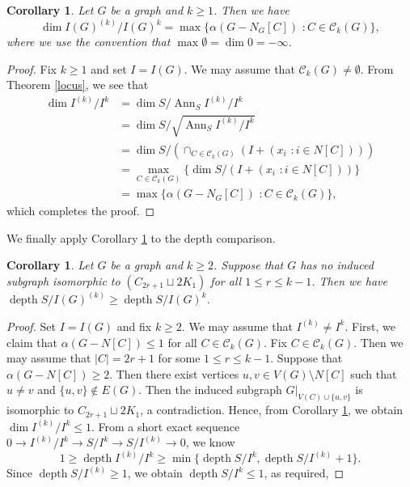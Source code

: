 \documentclass[12pt]{amsart}
\newtheorem{cor}[thm]{Corollary}
\theoremstyle{definition}
\theoremstyle{remark}
\DeclareMathOperator{\depth}{depth}
\DeclareMathOperator{\Ann}{Ann}
\begin{document}
\begin{cor}\label{char of dim}
Let $G$ be a graph and $k\geq1$. Then we have 
$$\dim I(G)^{(k)}/I(G)^{k}=\max\{\alpha(G-N_{G}[C])\,\,: C\in\mathcal{C}_{k}(G)\},$$
where we use the convention that $\max\emptyset=\dim 0=-\infty$. 
\end{cor}
\begin{proof}
Fix $k\geq1$ and set $I=I(G)$. We may assume that $\mathcal{C}_{k}(G)\neq\emptyset$. From Theorem \ref{locus}, we see that 
\begin{align*}
\dim I^{(k)}/I^{k}&=\dim S/\Ann_{S}I^{(k)}/I^{k}\\
&=\dim S/\sqrt{\Ann_{S}I^{(k)}/I^{k}} \\
&=\dim S/(\cap_{C\in\mathcal{C}_{k}(G)}(I+(x_{i}\,\,: i\in N[C]))) \\
&=\max_{C\in\mathcal{C}_{k}(G)}\{\dim S/(I+(x_{i}\,\,: i\in N[C]))\} \\
&=\max\{\alpha(G-N_{G}[C])\,\,: C\in\mathcal{C}_{k}(G)\},
\end{align*}
which completes the proof. 
\end{proof}

We finally apply Corollary \ref{char of dim} to the depth comparison. 

\begin{cor}\label{depth comparison free}
Let $G$ be a  graph and $k\geq2$. Suppose that $G$ has no induced subgraph isomorphic to  $(C_{2r+1}\sqcup2K_{1})$ for all $1\leq r\leq k-1$. Then we have $\depth S/I(G)^{(k)}\geq\depth S/I(G)^{k}$.  
\end{cor}
\begin{proof}
Set $I=I(G)$ and fix $k\geq2$. We may assume that $I^{(k)}\neq I^{k}$. First, we claim that $\alpha(G-N[C])\leq1$ for all $C\in\mathcal{C}_{k}(G)$. Fix $C\in\mathcal{C}_{k}(G)$. Then we may assume that $|C|=2r+1$ for some $1\leq r\leq k-1$. Suppose that $\alpha(G-N[C])\geq2$. Then there exist vertices $u,v\in V(G)\setminus N[C]$ such that $u\neq v$ and $\{u,v\}\notin E(G)$. Then the induced subgraph $G|_{V(C)\cup\{u,v\}}$ is isomorphic to $C_{2r+1}\sqcup2K_{1}$, a contradiction. Hence, from Corollary \ref{char of dim}, we obtain $\dim I^{(k)}/I^{k}\leq1$. From a short exact sequence $0\rightarrow I^{(k)}/I^{k}\rightarrow S/I^{k}\rightarrow S/I^{(k)}\rightarrow0$, we know 
$$1\geq\depth I^{(k)}/I^{k}\geq\min\{\depth S/I^{k}, \depth S/I^{(k)}+1\}.$$
Since $\depth S/I^{(k)}\geq1$, we obtain $\depth S/I^{k}\leq1$, as required, 
\end{proof}
\end{document}
